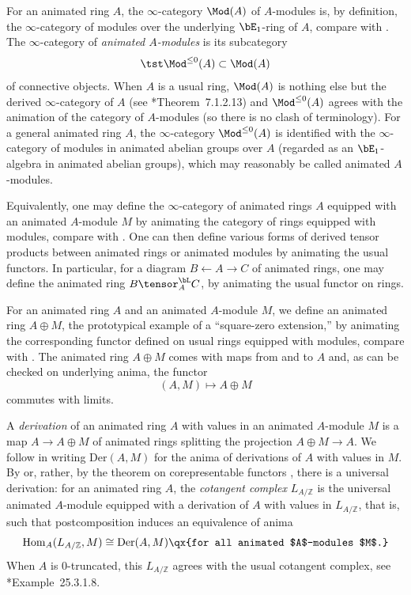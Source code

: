 For an animated ring $A$, the $\infty$-category $\Mod(A)$ of $A$-modules is, by definition, the $\infty$-category of modules over the underlying $\bE_1$-ring of $A$, compare with \cite[Notation~25.2.1.1]{SAG}. The $\infty$-category of \emph{animated $A$-modules} is its subcategory
\[
\tst \Mod^{\le 0}(A) \subset \Mod(A)
\]
of connective objects. When $A$ is a usual ring, $\Mod(A)$ is nothing else but the derived $\infty$-category of $A$ (see \cite{HA}*{Theorem~7.1.2.13}) and $\Mod^{\le 0}(A)$ agrees with the animation of the category of $A$-modules (so there is no clash of terminology). For a general animated ring $A$, the $\infty$-category $\Mod^{\le 0}(A)$ is identified with the $\infty$-category of modules in animated abelian groups over $A$ (regarded as an $\bE_1$-algebra in animated abelian groups), which may reasonably be called animated $A$-modules.

Equivalently, one may define the $\infty$-category of animated rings $A$ equipped with an animated $A$-module $M$ by animating the category of rings equipped with modules, compare with \cite[Proposition~25.2.1.2]{SAG}. One can then define various forms of derived tensor products between animated rings or animated modules by animating the usual functors. In particular, for a diagram $B\leftarrow A\to C$ of animated rings, one may define the animated ring $B\tensor^\bL_A C$, by animating the usual functor on rings.
\epp




 \label{pp:cot-cx}
For an animated ring $A$ and an animated $A$-module $M$, we define an animated ring $A\oplus M$, the prototypical example of a ``square-zero extension,'' by animating the corresponding functor defined on usual rings equipped with modules, compare with \cite[Construction~25.3.1.1]{SAG}. The animated ring $A \oplus M$ comes with maps from and to $A$ and, as can be checked on underlying anima, the functor
\[
(A,M)\mapsto A\oplus M
\]
commutes with %
limits.

A \emph{derivation} of an animated ring $A$ with values in an animated $A$-module $M$ is a map $A\to A\oplus M$ of animated rings splitting the projection $A\oplus M\to A$. We follow \cite[Definition~25.3.1.4]{SAG} in writing $\mathrm{Der}(A,M)$ for the anima of derivations of $A$ with values in $M$. By \cite[Proposition~25.3.1.5]{SAG} or, rather, by the theorem on corepresentable functors \cite[Proposition~5.5.2.7]{HTT}, there is a universal derivation: for an animated ring $A$, the \emph{cotangent complex} $L_{A/\mathbb Z}$ is the universal animated $A$-module equipped with a derivation of $A$ with values in $L_{A/\mathbb Z}$, that is, such that postcomposition induces an equivalence of anima
\[
\Hom_A(L_{A/\mathbb Z}, M)\cong \mathrm{Der}(A,M) \qx{for all animated $A$-modules $M$.}
\]%
When $A$ is $0$-truncated, this $L_{A/\mathbb Z}$ agrees with the usual cotangent complex, see \cite{SAG}*{Example~25.3.1.8}.

